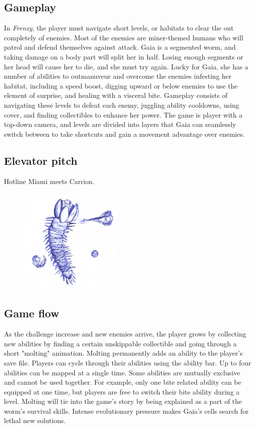 \documentclass[12pt]{report}
\begin{document}
\subsection*{Gameplay}
In \emph{Frenzy}, the player must navigate short levels, or habitats
to clear the out completely of enemies. Most of the enemies are 
miner-themed humans who will patrol and defend themselves against 
attack. Gaia is a segmented worm, and taking damage on a body part 
will split her in half. Losing enough segments or her head will cause 
her to die, and she must try again. Lucky for Gaia, she has a number
of abilities to outmanuveur and overcome the enemies infesting her
habitat, including a speed boost, digging upward or below enemies to 
use the element of surprise, and healing with a visceral bite.
Gameplay consists of navigating these levels to defeat each enemy, 
juggling ability cooldowns, using cover, and finding collectibles to
enhance her power. The game is player with a top-down camera, and levels
are divided into layers that Gaia can seamlessly switch between to take
shortcuts and gain a movement advantage over enemies.

\subsection*{Elevator pitch}
Hotline Miami meets Carrion.

\begin{figure}[h]
    \centering
    \includegraphics[width=2in]{img/worm.png}
\end{figure}

\subsection*{Game flow}
As the challenge increase and new enemies arrive, the player grows by
collecting new abilities by finding a certain unskippable collectible
and going through a short "molting" animation. Molting permanently adds
an ability to the player's save file. Players can cycle through their 
abilities using the ability bar. Up to four abilities can be mapped at
a single time. Some abilities are mutually exclusive and cannot be used
together. For example, only one bite related ability can be equipped at
one time, but players are free to switch their bite ability during a 
level. Molting will tie into the game's story by being explained as a 
part of the worm's survival skills. Intense evolutionary pressure makes
Gaia's cells search for lethal new solutions.
\end{document}
